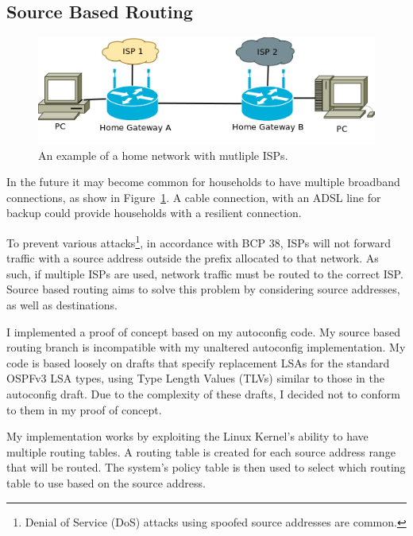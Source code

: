 \documentclass[12pt,a4paper,twoside]{report}
\begin{document}
\subsection{Source Based Routing}
\label{SourceBasedRouting}
\begin{figure}
\begin{center}
	\includegraphics[width=\linewidth]{../Diagrams/Network/MultipleISP.png}
	\caption{An example of a home network with mutliple ISPs.}\label{fig:MultipleISP}
\end{center}
\end{figure}
In the future it may become common for households to have multiple broadband
connections, as show in Figure~\ref{fig:MultipleISP}. A cable connection, with
an ADSL line for backup could provide households with a resilient connection. 

To prevent various attacks\footnote{Denial of Service
(DoS) attacks using spoofed source
addresses are common.}, in accordance with BCP 38\cite{bcp38}, ISPs will not
forward traffic with a source address outside the prefix allocated to that
network.  As such, if multiple ISPs are used, network traffic must be routed to
the correct ISP. Source based routing aims to solve this problem by considering
source addresses, as well as destinations. 

I implemented a proof of concept based on my autoconfig code. My source based
routing branch is incompatible with my unaltered autoconfig implementation. My
code is based loosely on drafts that specify replacement LSAs for the standard
OSPFv3 LSA types, using Type Length Values (TLVs) similar to those in the
autoconfig draft. Due to the complexity of these drafts, I decided not to
conform to them in my proof of concept.

My implementation works by exploiting the Linux Kernel's ability to have
multiple routing tables. A routing table is created for each source address
range that will be routed. The system's policy table is then used to select
which routing table to use based on the source address.  
\end{document}
